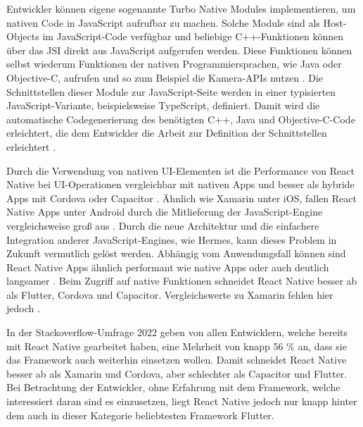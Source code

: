 Entwickler können eigene sogenannte Turbo Native Modules implementieren, um nativen Code in JavaScript aufrufbar zu machen.
Solche Module sind als Host-Objects im JavaScript-Code verfügbar und beliebige C++-Funktionen können über das \ac{JSI} direkt aus JavaScript aufgerufen werden.
Diese Funktionen können selbst wiederum Funktionen der nativen Programmiersprachen, wie Java oder Objective-C, aufrufen und so zum Beispiel die Kamera-\acp{API} nutzen \cite{Parashuram_React}.
Die Schnittstellen dieser Module zur JavaScript-Seite werden in einer typisierten JavaScript-Variante, beispielsweise TypeScript, definiert.
Damit wird die automatische Codegenerierung des benötigten C++, Java und Objective-C-Code erleichtert, die dem Entwickler die Arbeit zur Definition der Schnittstellen erleichtert \cite{ReactNative_newArchitecture}. 

Durch die Verwendung von nativen \ac{UI}-Elementen ist die Performance von React Native bei \ac{UI}-Operationen vergleichbar mit nativen Apps und besser als hybride Apps mit Cordova oder Capacitor \cite{Huber_UI}.
Ähnlich wie Xamarin unter iOS, fallen React Native Apps unter Android durch die Mitlieferung der JavaScript-Engine vergleichsweise groß aus \cite{Nawrocki_Comparison_Hybrid_Native_Frameworks}.
Durch die neue Architektur und die einfachere Integration anderer JavaScript-Engines, wie Hermes, kann dieses Problem in Zukunft vermutlich gelöst werden.
Abhängig vom Anwendungsfall können sind React Native Apps ähnlich performant wie native Apps oder auch deutlich langsamer \cite{Nawrocki_Comparison_Hybrid_Native_Frameworks}.
Beim Zugriff auf native Funktionen schneidet React Native besser ab als Flutter, Cordova und Capacitor.
Vergleichswerte zu Xamarin fehlen hier jedoch \cite{Biorn-Hansen_PerformanceOverhead_CrossPlatform}.

In der Stackoverflow-Umfrage 2022 \cite{Stackoverflow_2022} geben von allen Entwicklern, welche bereits mit React Native gearbeitet haben, eine Mehrheit von knapp 56 \% an, dass sie das Framework auch weiterhin einsetzen wollen.
Damit schneidet React Native besser ab als Xamarin und Cordova, aber schlechter als Capacitor und Flutter.
Bei Betrachtung der Entwickler, ohne Erfahrung mit dem Framework, welche interessiert daran sind es einzusetzen, liegt React Native jedoch nur knapp hinter dem auch in dieser Kategorie beliebtesten Framework Flutter.